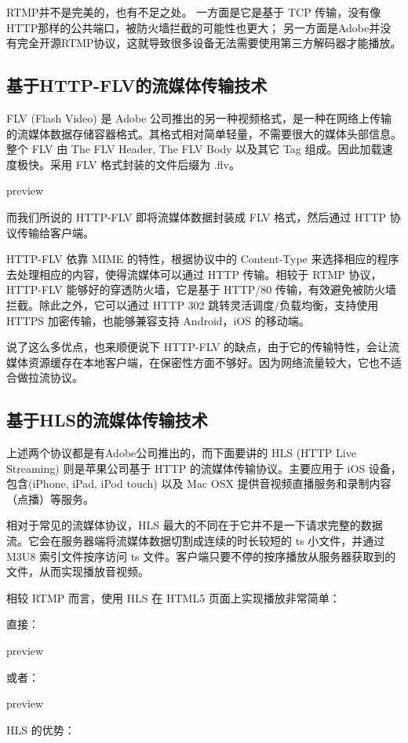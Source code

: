 RTMP并不是完美的，也有不足之处。
一方面是它是基于 TCP 传输，没有像HTTP那样的公共端口，被防火墙拦截的可能性也更大；
另一方面是Adobe并没有完全开源RTMP协议，这就导致很多设备无法需要使用第三方解码器才能播放。

\subsection{基于HTTP-FLV的流媒体传输技术}
FLV (Flash Video) 是 Adobe 公司推出的另一种视频格式，是一种在网络上传输的流媒体数据存储容器格式。其格式相对简单轻量，不需要很大的媒体头部信息。整个 FLV 由 The FLV Header, The FLV Body 以及其它 Tag 组成。因此加载速度极快。采用 FLV 格式封装的文件后缀为 .flv。

preview

而我们所说的 HTTP-FLV 即将流媒体数据封装成 FLV 格式，然后通过 HTTP 协议传输给客户端。

HTTP-FLV 依靠 MIME 的特性，根据协议中的 Content-Type 来选择相应的程序去处理相应的内容，使得流媒体可以通过 HTTP 传输。相较于 RTMP 协议，HTTP-FLV 能够好的穿透防火墙，它是基于 HTTP/80 传输，有效避免被防火墙拦截。除此之外，它可以通过 HTTP 302 跳转灵活调度/负载均衡，支持使用 HTTPS 加密传输，也能够兼容支持 Android，iOS 的移动端。

说了这么多优点，也来顺便说下 HTTP-FLV 的缺点，由于它的传输特性，会让流媒体资源缓存在本地客户端，在保密性方面不够好。因为网络流量较大，它也不适合做拉流协议。

\subsection{基于HLS的流媒体传输技术}


上述两个协议都是有Adobe公司推出的，而下面要讲的 HLS (HTTP Live Streaming) 则是苹果公司基于 HTTP 的流媒体传输协议。主要应用于 iOS 设备，包含(iPhone, iPad, iPod touch) 以及 Mac OSX 提供音视频直播服务和录制内容（点播）等服务。

相对于常见的流媒体协议，HLS 最大的不同在于它并不是一下请求完整的数据流。它会在服务器端将流媒体数据切割成连续的时长较短的 ts 小文件，并通过 M3U8 索引文件按序访问 ts 文件。客户端只要不停的按序播放从服务器获取到的文件，从而实现播放音视频。

相较 RTMP 而言，使用 HLS 在 HTML5 页面上实现播放非常简单：

直接：

preview

或者：

preview

HLS 的优势：

